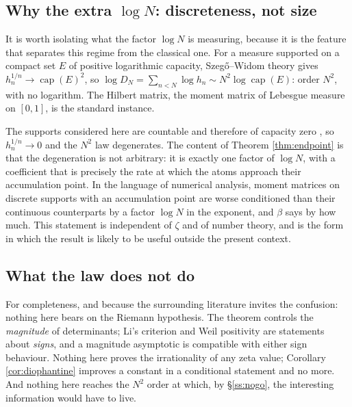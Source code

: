 \documentclass[11pt]{amsart}
\numberwithin{equation}{section}
\theoremstyle{plain}
\theoremstyle{definition}
\theoremstyle{remark}
\begin{document}
\subsection{Why the extra $\log N$: discreteness, not size}

It is worth isolating what the factor $\log N$ is measuring, because it is the feature that
separates this regime from the classical one. For a measure supported on a compact set $E$ of
positive logarithmic capacity, Szeg\H o--Widom theory gives $h_{n}^{1/n}\to\operatorname{cap}(E)^{2}$,
so $\log D_{N}=\sum_{n<N}\log h_{n}\sim N^{2}\log\operatorname{cap}(E)$: order $N^{2}$, with no
logarithm. The Hilbert matrix, the moment matrix of Lebesgue measure on $[0,1]$, is the standard
instance.

The supports considered here are countable and therefore of capacity zero
\cite{StahlTotik1992,Totik2005Orthogonal}, so $h_{n}^{1/n}\to0$ and the $N^{2}$ law degenerates. The
content of Theorem \ref{thm:endpoint} is that the degeneration is not arbitrary: it is exactly one
factor of $\log N$, with a coefficient that is precisely the rate at which the atoms approach their
accumulation point. In the language of numerical analysis, moment matrices on discrete supports
with an accumulation point are worse conditioned than their continuous counterparts by a factor
$\log N$ in the exponent, and $\beta$ says by how much. This statement is independent of $\zeta$ and
of number theory, and is the form in which the result is likely to be useful outside the present
context.

\subsection{What the law does not do}

For completeness, and because the surrounding literature invites the confusion: nothing here bears
on the Riemann hypothesis. The theorem controls the \emph{magnitude} of determinants; Li's criterion
and Weil positivity are statements about \emph{signs}, and a magnitude asymptotic is compatible with
either sign behaviour. Nothing here proves the irrationality of any zeta value; Corollary
\ref{cor:diophantine} improves a constant in a conditional statement and no more. And nothing here
reaches the $N^{2}$ order at which, by \S\ref{ss:nogo}, the interesting information would have to
live.
\end{document}
